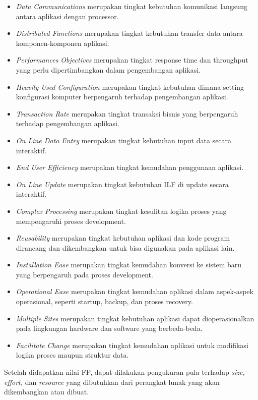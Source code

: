 \documentclass[a4paper]{article}
\begin{document}
\begin{multicols}{2}
\begin{itemize}
    \item \textit{Data Communications} merupakan tingkat kebutuhan komunikasi langsung antara aplikasi dengan processor.
    \item \textit{Distributed Functions} merupakan tingkat kebutuhan transfer data antara komponen-komponen aplikasi.
    \item \textit{Performances Objectives} merupakan tingkat response time dan throughput yang perlu dipertimbangkan dalam pengembangan aplikasi.
    \item \textit{Heavily Used Configuration} merupakan tingkat kebutuhan dimana setting konfigurasi komputer berpengaruh terhadap pengembangan aplikasi.
    \item \textit{Transaction Rate} merupakan tingkat transaksi bisnis yang berpengaruh terhadap pengembangan aplikasi.
    \item \textit{On Line Data Entry} merupakan tingkat kebutuhan input data secara interaktif.
    \item \textit{End User Efficiency} merupakan tingkat kemudahan penggunaan aplikasi.
    \item \textit{On Line Update} merupakan tingkat kebutuhan ILF di update secara interaktif.
    \item \textit{Complex Processing} merupakan tingkat kesulitan logika proses yang mempengaruhi proses development.
    \item \textit{Reusability} merupakan tingkat kebutuhan aplikasi dan kode program dirancang dan dikembangkan untuk bisa digunakan pada aplikasi lain.
    \item \textit{Installation Ease} merupakan tingkat kemudahan konversi ke sistem baru yang berpengaruh pada proses development.
    \item \textit{Operational Ease} merupakan tingkat kemudahan aplikasi dalam aspek-aspek operasional, seperti startup, backup, dan proses recovery.
    \item \textit{Multiple Sites} merupakan tingkat kebutuhan aplikasi dapat dioperasionalkan pada lingkungan hardware dan software yang berbeda-beda.
    \item \textit{Facilitate Change} merupakan tingkat kemudahan aplikasi untuk modifikasi logika proses maupun struktur data.
\end{itemize}

\par Setelah didapatkan nilai FP, dapat dilakukan pengukuran pula terhadap \textit{size, effort,} dan \textit{resource} yang dibutuhkan dari perangkat lunak yang akan dikembangkan atau dibuat.


\end{multicols}
\end{document}
